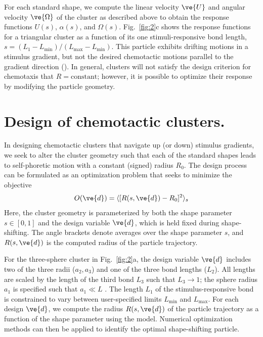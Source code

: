 For each standard shape, we compute the linear velocity $\ve{U}$ and angular velocity $\ve{\Omega}$ of the cluster as described above to obtain the response functions $U(s)$, $\alpha(s)$, and $\Omega(s)$. Fig.\ \ref{fig:2}c shows the response functions for a triangular cluster as a function of its one stimuli-responsive bond length, $s = (L_1 - L_{\min})/(L_{\max}-L_{\min})$.  This particle exhibits drifting motions in a stimulus gradient, but not the desired chemotactic motions parallel to the gradient direction ().  In general, clusters will not satisfy the design criterion for chemotaxis that $R=\text{constant}$; however, it is possible to optimize their response by modifying the particle geometry.

\section{Design of chemotactic clusters.} In designing chemotactic clusters that navigate up (or down) stimulus gradients, we seek to alter the cluster geometry such that each of the standard shapes leads to self-phoretic motion with a constant (signed) radius $R_0$. The design process can be formulated as an optimization problem that seeks to minimize the objective
\begin{equation}
    O(\ve{d}) = \langle [R(s,\ve{d})-R_0]^2 \rangle_s
\end{equation}
Here, the cluster geometry is parameterized by both the shape parameter $s\in[0,1]$ and the design variable $\ve{d}$, which is held fixed during shape-shifting.  The angle brackets denote averages over the shape parameter $s$, and $R(s,\ve{d})$ is the computed radius of the particle trajectory.

For the three-sphere cluster in Fig.\ \ref{fig:2}a, the design variable $\ve{d}$ includes two of the three radii ($a_2,a_3$) and one of the three bond lengths ($L_2$). All lengths are scaled by the length of the third bond $L_3$ such that $L_3\rightarrow 1$; the sphere radius $a_1$ is specified such that $a_1\ll L$ . The length $L_1$ of the stimulus-responsive bond is constrained to vary between user-specified limits $L_{\min}$ and $L_{\max}$. For each design $\ve{d}$, we compute the radius $R(s,\ve{d})$ of the particle trajectory as a function of the shape parameter using the model.  Numerical optimization methods can then be applied to identify the optimal shape-shifting particle.

